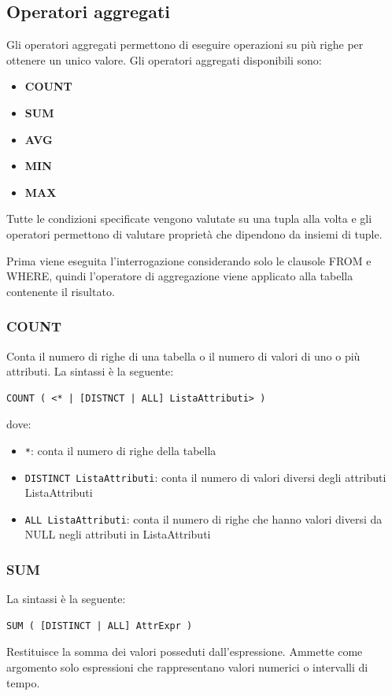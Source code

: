 \documentclass[a4paper,twoside]{article}
\begin{document}
\subsection{Operatori aggregati}
Gli operatori aggregati permettono di eseguire operazioni su più righe per ottenere un unico
valore. Gli operatori aggregati disponibili sono:
\begin{itemize}
  \item \textbf{COUNT}
  \item \textbf{SUM}
  \item \textbf{AVG}
  \item \textbf{MIN}
  \item \textbf{MAX}
\end{itemize}
Tutte le condizioni specificate vengono valutate su una tupla alla volta e gli operatori
permettono di valutare proprietà che dipendono da insiemi di tuple.

Prima viene eseguita l’interrogazione considerando solo le clausole
FROM e WHERE, quindi l’operatore di aggregazione viene applicato alla
tabella contenente il risultato.

\subsubsection{COUNT}
Conta il numero di righe di una tabella o il numero di valori di uno o più attributi.
La sintassi è la seguente:
\begin{lstlisting}
COUNT ( <* | [DISTNCT | ALL] ListaAttributi> )
\end{lstlisting}
dove:
\begin{itemize}
  \item \texttt{*}: conta il numero di righe della tabella

  \item \texttt{DISTINCT ListaAttributi}: conta il numero di valori diversi degli
    attributi ListaAttributi

  \item \texttt{ALL ListaAttributi}: conta il numero di righe che hanno valori diversi da
    NULL negli attributi in ListaAttributi
\end{itemize}

\subsubsection{SUM}
La sintassi è la seguente:
\begin{lstlisting}
SUM ( [DISTINCT | ALL] AttrExpr )
\end{lstlisting}
Restituisce la somma dei valori posseduti dall'espressione.
Ammette come argomento solo espressioni che rappresentano valori numerici o intervalli
di tempo.
\end{document}
